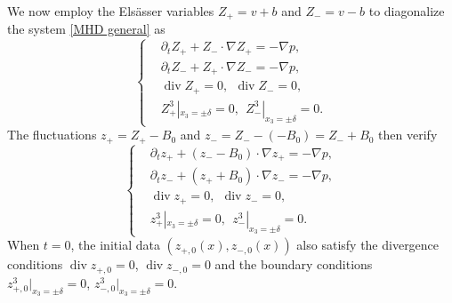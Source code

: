 \documentclass[10pt,reqno]{amsart}
\numberwithin{equation}{section}
\begin{document}
We now employ the Els\"{a}sser variables $Z_+ = v +b$ and $Z_- = v-b$ to diagonalize the system \eqref{MHD general} as  
\begin{equation}\label{MHD in Elsasser}\begin{cases}
		&\partial_t  Z_+ +Z_- \cdot \nabla Z_+ = -\nabla p, \\
		&\partial_t  Z_- +Z_+ \cdot \nabla Z_- = -\nabla p,\\
		&\operatorname{div} Z_+ =0,\ \
		\operatorname{div} Z_- =0,\\ 
		&Z_+^3|_{x_3=\pm\delta}=0,\ \ Z_-^3|_{x_3=\pm\delta}=0.
\end{cases}\end{equation}
The fluctuations $z_{+}=Z_{+}-B_0$ and $z_{-}=Z_{-}-(-B_0)=Z_-+B_0$ then
 verify  
\begin{equation}\label{MHD equation}\begin{cases}
		&\partial_{t}z_{+}+(z_--B_0)\cdot \nabla z_{+} =-\nabla p,\\
		&\partial_{t}z_{-}+(z_++B_0)\cdot \nabla z_{-} =-\nabla p,\\
		&\operatorname{div} z_{+}=0,\ \
		\operatorname{div} z_{-}=0,\\
		&z_+^3|_{x_3=\pm\delta}=0,\ \ z_-^3|_{x_3=\pm\delta}=0.
\end{cases}\end{equation}
When $t=0$, 
the initial data $(z_{+,0}(x),z_{-,0}(x))$ also satisfy the divergence  conditions  $\operatorname{div} z_{+,0}=0$,  
$\operatorname{div} z_{-,0}=0$ and the boundary conditions 
$z_{+,0}^3|_{x_3=\pm\delta}=0$,  $z_{-,0}^3|_{x_3=\pm\delta}=0$. 
 
\end{document}
